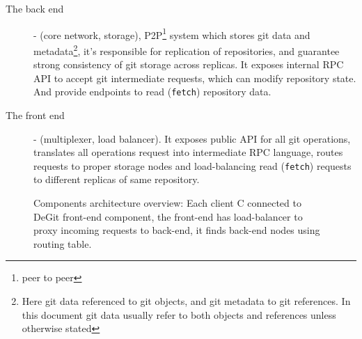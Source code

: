 \documentclass[12pt,oneside]{article}
\newcommand{\code}[1]{\texttt{#1}}
\begin{document}
\begin{description}
  \item[The back end] - (core network, storage), P2P\footnote{peer to peer} system which stores git data
    and metadata\footnote{Here git data referenced to git objects, and git metadata to git references.
    In this document git data usually refer to both objects and references unless otherwise stated},
    it's responsible for replication of repositories, and guarantee
    strong consistency of git storage across replicas. It exposes internal RPC API to accept git intermediate
    requests, which can modify repository state. And provide endpoints to read (\code{fetch}) repository data.
  \item[The front end] - (multiplexer, load balancer). It exposes public API for all git operations,
    translates all operations request into intermediate RPC language, routes requests to proper storage
    nodes and load-balancing read (\code{fetch}) requests to different replicas of same repository.
\end{description}

\begin{figure}
  \begin{center}
  \end{center}
  \caption{
    Components architecture overview:
    Each client C connected to DeGit front-end component,
    the front-end has load-balancer to proxy incoming requests to back-end,
    it finds back-end nodes using routing table.
  }
  \label{fig:comp-arc-overview}
\end{figure}
\end{document}
